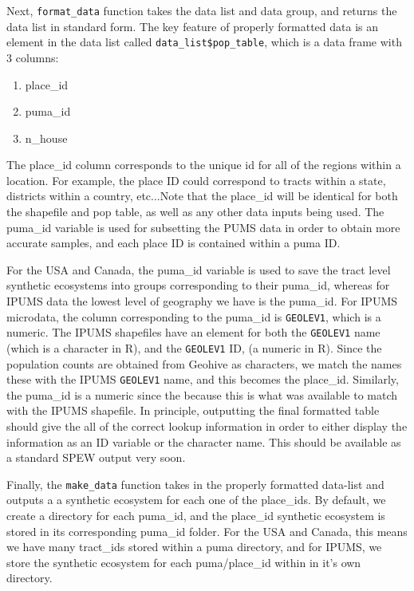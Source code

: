 \documentclass{article}
\begin{document}
Next, \verb|format_data| function takes the data list and data group, and returns the data list in standard form. The key feature of properly formatted data is an element in the data list called \verb|data_list$pop_table|, which is a data frame with 3 columns:

\begin{enumerate}
	\item place\_id
	\item puma\_id 
	\item n\_house 
\end{enumerate}

The place\_id column corresponds to the unique id for all of the regions within a location. For example, the place ID could correspond to tracts within a state, districts within a country, etc...Note that the place\_id will be identical for both the shapefile and pop table, as well as any other data inputs being used. The puma\_id variable is used for subsetting the PUMS data in order to obtain more accurate samples, and each place ID is contained within a puma ID. 

For the USA and Canada, the puma\_id variable is used to save the tract level synthetic ecosystems into groups corresponding to their puma\_id, whereas for IPUMS data the lowest level of geography we have is the puma\_id. For IPUMS microdata, the column corresponding to the puma\_id is \verb|GEOLEV1|, which is a numeric. The IPUMS shapefiles have an element for both the \verb|GEOLEV1| name (which is a character in R), and the \verb|GEOLEV1| ID, (a numeric in R). Since the population counts are obtained from Geohive as characters, we match the names these with the IPUMS \verb|GEOLEV1| name, and this becomes the place\_id. Similarly, the puma\_id is a numeric since the because this is what was available to match with the IPUMS shapefile. In principle, outputting the final formatted table should give the all of the correct lookup information in order to either display the information as an ID variable or the character name. This should be available as a standard SPEW output very soon. 

Finally, the \verb|make_data| function takes in the properly formatted data-list and outputs a a synthetic ecosystem for each one of the place\_ids. By default, we create a directory for each puma\_id, and the place\_id synthetic ecosystem is stored in its corresponding puma\_id folder. For the USA and Canada, this means we have many tract\_ids stored within a puma directory, and for IPUMS, we store the synthetic ecosystem for each puma/place\_id within in it's own directory. 
\end{document}
